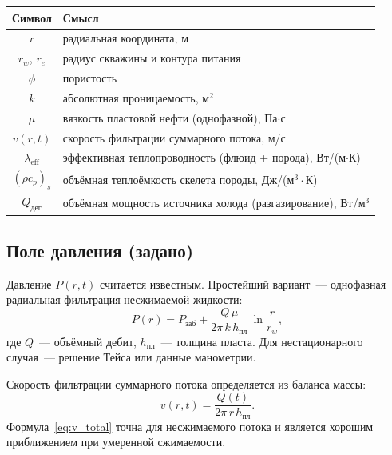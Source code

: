 \documentclass[12pt,a4paper]{article}
\begin{document}
\begin{center}
\renewcommand{\arraystretch}{1.25}
\begin{tabular}{cl}
  \hline
  Символ & Смысл \\
  \hline
  $r$                   & радиальная координата, м \\
  $r_w$, $r_e$          & радиус скважины и контура питания \\
  $\phi$                & пористость \\
  $k$                   & абсолютная проницаемость, м$^2$ \\
  $\mu$                 & вязкость пластовой нефти (однофазной), Па$\cdot$с \\
  $v(r,t)$              & скорость фильтрации суммарного потока, м/с \\
  $\lambda_{\mathrm{eff}}$ & эффективная теплопроводность
                             (флюид + порода), Вт/(м$\cdot$К) \\
  $(\rho c_p)_s$        & объёмная теплоёмкость скелета породы, Дж/(м$^3\cdot$К) \\
  $Q_{\text{дег}}$      & объёмная мощность источника холода
                           (разгазирование), Вт/м$^3$ \\
  \hline
\end{tabular}
\end{center}

\subsection{Поле давления (задано)}

Давление $P(r,t)$ считается известным. Простейший вариант~---
однофазная радиальная фильтрация несжимаемой жидкости:
\begin{equation}\label{eq:P_ss}
  P(r) = P_{\text{заб}} + \frac{Q\,\mu}{2\pi\,k\,h_{\text{пл}}}\,
         \ln\frac{r}{r_w},
\end{equation}
где $Q$~--- объёмный дебит, $h_{\text{пл}}$~--- толщина пласта.
Для нестационарного случая~--- решение Тейса или данные манометрии.

Скорость фильтрации суммарного потока определяется из баланса массы:
\begin{equation}\label{eq:v_total}
  v(r,t) = \frac{Q(t)}{2\pi\,r\,h_{\text{пл}}}.
\end{equation}
Формула~\eqref{eq:v_total} точна для несжимаемого потока и является
хорошим приближением при умеренной сжимаемости.
\end{document}
